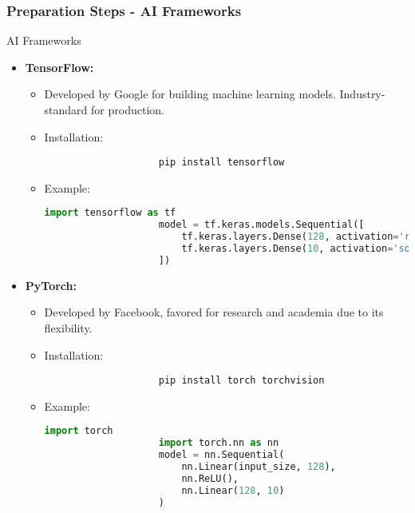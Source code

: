 \documentclass{beamer}
\begin{document}
\begin{frame}[fragile]
    \frametitle{Preparation Steps - AI Frameworks}
    \begin{block}{AI Frameworks}
        \begin{itemize}
            \item \textbf{TensorFlow:}
            \begin{itemize}
                \item Developed by Google for building machine learning models. Industry-standard for production.
                \item Installation: 
                \begin{lstlisting}
                    pip install tensorflow
                \end{lstlisting}
                \item Example:
                \begin{lstlisting}[language=Python]
                    import tensorflow as tf
                    model = tf.keras.models.Sequential([
                        tf.keras.layers.Dense(128, activation='relu', input_shape=(input_shape,)),
                        tf.keras.layers.Dense(10, activation='softmax')
                    ])
                \end{lstlisting}
            \end{itemize}
            \item \textbf{PyTorch:}
            \begin{itemize}
                \item Developed by Facebook, favored for research and academia due to its flexibility.
                \item Installation: 
                \begin{lstlisting}
                    pip install torch torchvision
                \end{lstlisting}
                \item Example:
                \begin{lstlisting}[language=Python]
                    import torch
                    import torch.nn as nn
                    model = nn.Sequential(
                        nn.Linear(input_size, 128),
                        nn.ReLU(),
                        nn.Linear(128, 10)
                    )
                \end{lstlisting}
            \end{itemize}
        \end{itemize}
    \end{block}
\end{frame}
\end{document}
